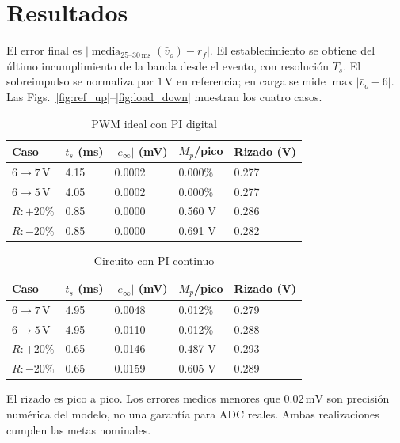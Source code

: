 \documentclass[conference,letterpaper]{IEEEtran}
\begin{document}
\section{Resultados}
El error final es $|\operatorname{media}_{25\text{--}30\,\mathrm{ms}}(\bar v_o)-r_f|$. El establecimiento se obtiene del último incumplimiento de la banda desde el evento, con resolución $T_s$. El sobreimpulso se normaliza por $1\,\mathrm{V}$ en referencia; en carga se mide $\max|\bar v_o-6|$. Las Figs.~\ref{fig:ref_up}--\ref{fig:load_down} muestran los cuatro casos.

\begin{table}[H]\caption{PWM ideal con PI digital}\label{tab:pwm}\centering\footnotesize\setlength{\tabcolsep}{2pt}\renewcommand{\arraystretch}{1.18}\begin{tabularx}{\columnwidth}{LYYYY}\toprule
Caso & $t_s$ (ms) & $|e_\infty|$ (mV) & $M_p$/pico & Rizado (V)\\\midrule
$6\to7\,\mathrm{V}$ & 4.15 & 0.0002 & 0.000\% & 0.277\\
$6\to5\,\mathrm{V}$ & 4.05 & 0.0002 & 0.000\% & 0.277\\
$R:+20\%$ & 0.85 & 0.0000 & 0.560 V & 0.286\\
$R:-20\%$ & 0.85 & 0.0000 & 0.691 V & 0.282\\\bottomrule\end{tabularx}\end{table}
\begin{table}[H]\caption{Circuito con PI continuo}\label{tab:circuit}\centering\footnotesize\setlength{\tabcolsep}{2pt}\renewcommand{\arraystretch}{1.18}\begin{tabularx}{\columnwidth}{LYYYY}\toprule
Caso & $t_s$ (ms) & $|e_\infty|$ (mV) & $M_p$/pico & Rizado (V)\\\midrule
$6\to7\,\mathrm{V}$ & 4.95 & 0.0048 & 0.012\% & 0.279\\
$6\to5\,\mathrm{V}$ & 4.95 & 0.0110 & 0.012\% & 0.288\\
$R:+20\%$ & 0.65 & 0.0146 & 0.487 V & 0.293\\
$R:-20\%$ & 0.65 & 0.0159 & 0.605 V & 0.289\\\bottomrule\end{tabularx}\end{table}
El rizado es pico a pico. Los errores medios menores que $0.02\,\mathrm{mV}$ son precisión numérica del modelo, no una garantía para ADC reales. Ambas realizaciones cumplen las metas nominales.
\end{document}
